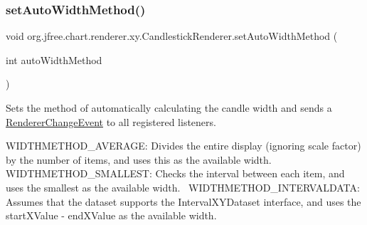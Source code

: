 \subsubsection{\texorpdfstring{set\+Auto\+Width\+Method()}{setAutoWidthMethod()}}
{\footnotesize\ttfamily void org.\+jfree.\+chart.\+renderer.\+xy.\+Candlestick\+Renderer.\+set\+Auto\+Width\+Method (\begin{DoxyParamCaption}\item[{int}]{auto\+Width\+Method }\end{DoxyParamCaption})}

Sets the method of automatically calculating the candle width and sends a \mbox{\hyperlink{}{Renderer\+Change\+Event}} to all registered listeners. 

{\ttfamily W\+I\+D\+T\+H\+M\+E\+T\+H\+O\+D\+\_\+\+A\+V\+E\+R\+A\+GE}\+: Divides the entire display (ignoring scale factor) by the number of items, and uses this as the available width.~\newline
 {\ttfamily W\+I\+D\+T\+H\+M\+E\+T\+H\+O\+D\+\_\+\+S\+M\+A\+L\+L\+E\+ST}\+: Checks the interval between each item, and uses the smallest as the available width.~\newline
 {\ttfamily W\+I\+D\+T\+H\+M\+E\+T\+H\+O\+D\+\_\+\+I\+N\+T\+E\+R\+V\+A\+L\+D\+A\+TA}\+: Assumes that the dataset supports the Interval\+X\+Y\+Dataset interface, and uses the start\+X\+Value -\/ end\+X\+Value as the available width. ~\newline



